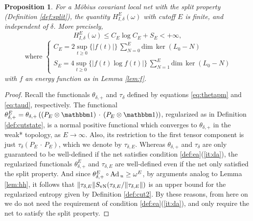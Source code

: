 \documentclass[a4paper,12pt]{article}
\theoremstyle{plain}
\newtheorem{prop}[theo]{Proposition}
\theoremstyle{definition}
\theoremstyle{remark}
\newcommand{\compcent}[1]{\vcenter{\hbox{$#1\circ$}}}
\newcommand{\comp}{\mathbin{\mathchoice
{\compcent\scriptstyle}{\compcent\scriptstyle}
{\compcent\scriptscriptstyle}{\compcent\scriptscriptstyle}}}
\newcommand{\Svn}{S_{\rm vN}}
\def\Ad{{\hbox{\rm Ad\,}}}
\def\dim{\mathrm{dim}\,}
\def\1{{\mathbbm 1}}
\begin{document}
\begin{prop}\label{pro:cut2} For a M\"obius covariant local net with the split property (Definition \ref{def:split}),
the quantity $H_{I,\delta}^E(\omega)$ with cutoff $E$ is finite, and independent of $\delta$. More precisely,
\[
 H_{I,\delta}^E(\omega) \le C_E\log C_E + S_E < +\infty,
\]
\[
 \text{ where } \left\{ 
  \begin{array}{l}{\displaystyle
    C_E = 2 \sup_{t \ge 0}\{  |f(t)| \} \,\sum_{N=0}^E \dim \ker (L_0 -N) }\\
    {\displaystyle S_E = 4 \sup_{t \ge 0}\{ |f(t)\log f(t)| \} \, \sum_{N=1}^E \dim\ker(L_0-N)}
  \end{array} \right.
\]
with $f$ an energy function as in Lemma \ref{lem:f}.
\end{prop}

\begin{proof}
Recall the functionals $\theta_{\delta,+}$ and $\tau_{\delta}$ defined by equations \eqref{eq:thetapm} and \eqref{eq:taud}, respectively.
The functional $\theta_{\delta,+}^E = \theta_{\delta,+} \left( (P_E\otimes \1)\,\cdot\,(P_E\otimes \1)\right) $, regularized as in Definition \ref{def:cutstate}, is a normal positive functional which converges to $\theta_{\delta,+}$ in the weak* topology, as $E\to\infty$.
Also, its restriction to the first tensor component is just $\tau_\delta\left(P_E\,\cdot\,P_E\right)$, which we denote by $\tau_{\delta,E}$.
Whereas $\theta_{\delta,+}$ and $\tau_{\delta}$ are only guaranteed to be well-defined if the net satisfies condition \ref{def:ea}(\ref{it:da}),
the regularized functionals $\theta_{\delta,+}^E$ and $\tau_{\delta,E}$ are well-defined even if the net only satisfied the split property.
And since $\theta_{\delta,+}^E\comp \Ad_u \ge \omega^E$, by arguments analog to Lemma \ref{lem:hh},
it follows that $\|\tau_{\delta,E}\|\Svn(\tau_{\delta,E}/\|\tau_{\delta,E}\|)$ is an upper bound for the regularized entropy given by Definition \ref{def:cut2}.
By these reasons, from here on we do not need the requirement of condition \ref{def:ea}(\ref{it:da}),
and only require the net to satisfy the split property.


\end{proof}
\end{document}
